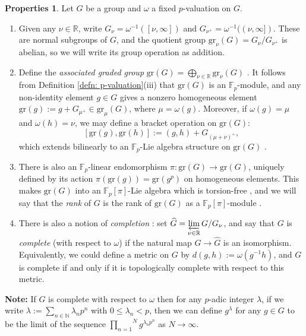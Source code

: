 \documentclass[12pt,a4paper]{article}
\theoremstyle{definition}
\newtheorem{props}[thm]{Properties}
\theoremstyle{remark}
\theoremstyle{custthm}
\newcommand{\gr}{\mathrm{gr}}
\begin{document}
\begin{props}
\label{props: p-valuations}
Let $G$ be a group and $\omega$ a fixed $p$-valuation on $G$.

\begin{enumerate}
\item Given any $\nu\in\mathbb{R}$, write $G_\nu = \omega^{-1}([\nu, \infty])$ and $G_{\nu^+} = \omega^{-1}((\nu, \infty])$. These are normal subgroups of $G$, and the quotient group $\gr_\nu(G) = G_\nu/G_{\nu^+}$ is abelian, so we will write its group operation as addition.
\item Define the \emph{associated graded group} $\displaystyle \gr(G) = \bigoplus_{\nu\in\mathbb{R}} \gr_\nu(G)$ \cite[Ch. II, 1.1.7.2]{Laz65}. It follows from Definition \ref{defn: p-valuation}(iii) that $\gr(G)$ is an $\mathbb{F}_p$-module, and any non-identity element $g\in G$ gives a nonzero homogeneous element $\gr(g) := g + G_{\mu^+}\in \gr_\mu (G)$, where $\mu = \omega(g)$. Moreover, if $\omega(g) = \mu$ and $\omega(h) = \nu$, we may define a bracket operation on $\gr(G)$:
$$[\gr(g), \gr(h)] := (g,h) + G_{(\mu+\nu)^+},$$
which extends bilinearly to an $\mathbb{F}_p$-Lie algebra structure on $\gr(G)$ \cite[Ch. II, 1.1.7]{Laz65}.
\item There is also an $\mathbb{F}_p$-linear endomorphism $\pi: \gr(G) \to \gr(G)$, uniquely defined by its action $\pi(\gr(g)) = \gr(g^p)$ on homogeneous elements. This makes $\gr(G)$ into an $\mathbb{F}_p[\pi]$-Lie algebra \cite[Ch. II, 2.1.1]{Laz65} which is torsion-free \cite[Ch. I, Th\'eor\`eme 1.2.3]{Laz65}, and we will say that the \emph{rank} of $G$ is the rank of $\gr(G)$ as a $\mathbb{F}_p[\pi]$-module \cite[D\'efinition 2.1.3]{Laz65}.
\item There is also a notion of \emph{completion} \cite[Ch. II, 1.1.5]{Laz65}: set $\displaystyle\widehat{G} = \varprojlim_{\nu\in\mathbb{R}} G/G_\nu$, and say that $G$ is \emph{complete} (with respect to $\omega$) if the natural map $G\to \widehat{G}$ is an isomorphism. Equivalently, we could define a metric on $G$ by $d(g,h):=\omega(g^{-1}h)$, and $G$ is complete if and only if it is topologically complete with respect to this metric.
\end{enumerate}
\end{props}

\textbf{Note:} If $G$ is complete with respect to $\omega$ then for any $p$-adic integer $\lambda$, if we write $\lambda:=\underset{n\in\mathbb{N}}{\sum}\lambda_np^n$ with $0\leq\lambda_n<p$, then we can define $g^\lambda$ for any $g\in G$ to be the limit of the sequence $\overset{N}{\underset{n=1}{\prod}}g^{\lambda_np^n}$ as $N\rightarrow\infty$.
\end{document}
